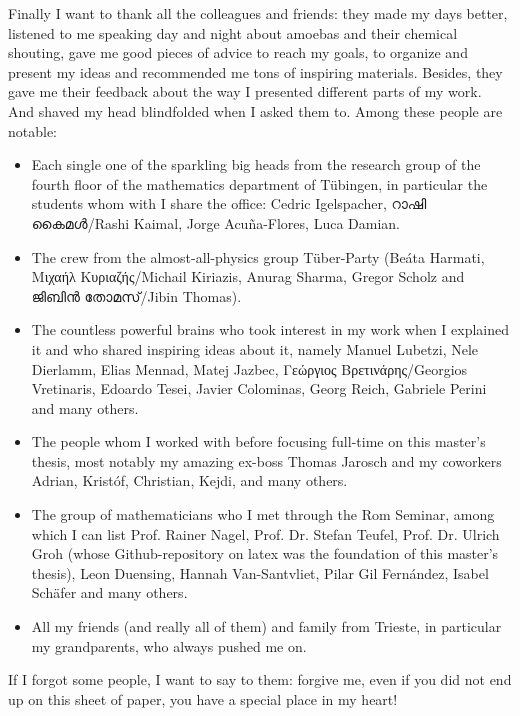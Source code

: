 Finally I want to thank all the colleagues and friends: they made my days better, listened to me speaking day and night about amoebas and their chemical shouting, gave me good pieces of advice to reach my goals, to organize and present my ideas and recommended me tons of inspiring materials.
Besides, they gave me their feedback about the way I presented different parts of my work.
And shaved my head blindfolded when I asked them to.
Among these people are notable: 
\begin{itemize}
	\item Each single one of the sparkling big heads from the research group of the fourth floor of the mathematics department of Tübingen, in particular the students whom with I share the office: Cedric Igelspacher, {\malayalamfont റാഷി കൈമൾ}/Rashi Kaimal, Jorge Acuña-Flores, Luca Damian.
	\item The crew from the almost-all-physics group Tüber-Party (Beáta Harmati, Μιχαήλ Κυριαζής/Michail Kiriazis, Anurag Sharma, Gregor Scholz and {\malayalamfont ജിബിൻ തോമസ്}/Jibin Thomas).
	\item The countless powerful brains who took interest in my work when I explained it and who shared inspiring ideas about it, namely Manuel Lubetzi, Nele Dierlamm, Elias Mennad, Matej Jazbec, Γεώργιος Βρετινάρης/Georgios Vretinaris, Edoardo Tesei, Javier Colominas, Georg Reich, Gabriele Perini and many others.
	\item The people whom I worked with before focusing full-time on this master's thesis, most notably my amazing ex-boss Thomas Jarosch and my coworkers Adrian, Kristóf, Christian, Kejdi, and many others.
	\item The group of mathematicians who I met through the Rom Seminar, among which I can list Prof. Rainer Nagel, Prof. Dr. Stefan Teufel, Prof. Dr. Ulrich Groh (whose Github-repository on latex was the foundation of this master's thesis), Leon Duensing, Hannah Van-Santvliet, Pilar Gil Fernández, Isabel Schäfer and many others.	
	\item All my friends (and really all of them) and family from Trieste, in particular my grandparents, who always pushed me on.
\end{itemize}
If I forgot some people, I want to say to them: forgive me, even if you did not end up on this sheet of paper, you have a special place in my heart! 